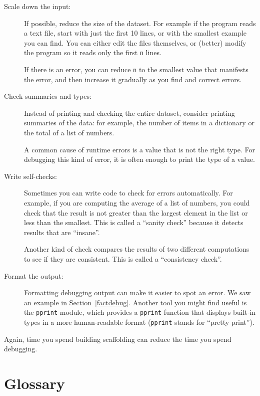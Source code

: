 \documentclass[10pt]{book}
\begin{document}
\begin{description}

\item[Scale down the input:] If possible, reduce the size of the
dataset.  For example if the program reads a text file, start with
just the first 10 lines, or with the smallest example you can find.
You can either edit the files themselves, or (better) modify the
program so it reads only the first {\tt n} lines.

If there is an error, you can reduce {\tt n} to the smallest
value that manifests the error, and then increase it gradually
as you find and correct errors.

\item[Check summaries and types:] Instead of printing and checking the
entire dataset, consider printing summaries of the data: for example,
the number of items in a dictionary or the total of a list of numbers.

A common cause of runtime errors is a value that is not the right
type.  For debugging this kind of error, it is often enough to print
the type of a value.

\item[Write self-checks:]  Sometimes you can write code to check
for errors automatically.  For example, if you are computing the
average of a list of numbers, you could check that the result is
not greater than the largest element in the list or less than
the smallest.  This is called a ``sanity check'' because it detects
results that are ``insane''.

Another kind of check compares the results of two different
computations to see if they are consistent.  This is called a
``consistency check''.

\item[Format the output:] Formatting debugging output
can make it easier to spot an error.  We saw an example in
Section~\ref{factdebug}.  Another tool you might find useful is the {\tt pprint} module, which provides
a {\tt pprint} function that displays built-in types in
a more human-readable format ({\tt pprint} stands for
``pretty print'').

\end{description}

Again, time you spend building scaffolding can reduce
the time you spend debugging.


\section{Glossary}
\end{document}
